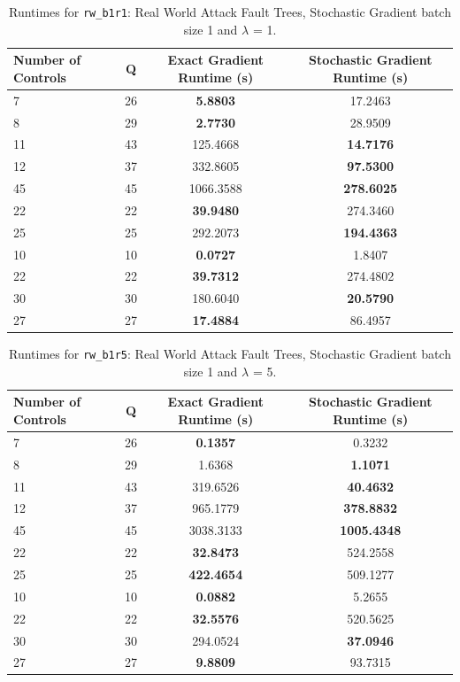 \documentclass{article}
\begin{document}
\begin{table}[h]
\centering
\begin{tabular}{lccc}
\toprule
Number of Controls & Q & Exact Gradient Runtime (s) & Stochastic Gradient Runtime (s) \\
\midrule
7 & 26 & \textbf{5.8803} & 17.2463 \\
8 & 29 & \textbf{2.7730} & 28.9509 \\
11 & 43 & 125.4668 & \textbf{14.7176} \\
12 & 37 & 332.8605 & \textbf{97.5300} \\
45 & 45 & 1066.3588 & \textbf{278.6025} \\
22 & 22 & \textbf{39.9480} & 274.3460 \\
25 & 25 & 292.2073 & \textbf{194.4363} \\
10 & 10 & \textbf{0.0727} & 1.8407 \\
22 & 22 & \textbf{39.7312} & 274.4802 \\
30 & 30 & 180.6040 & \textbf{20.5790} \\
27 & 27 & \textbf{17.4884} & 86.4957 \\
\bottomrule
\end{tabular}
\caption{Runtimes for \texttt{rw\_b1r1}: Real World Attack Fault Trees, Stochastic Gradient batch size 1 and $\lambda$ = 1.}
\end{table}

\begin{table}[h]
\centering
\begin{tabular}{lccc}
\toprule
Number of Controls & Q & Exact Gradient Runtime (s) & Stochastic Gradient Runtime (s) \\
\midrule
7 & 26 & \textbf{0.1357} & 0.3232 \\
8 & 29 & 1.6368 & \textbf{1.1071} \\
11 & 43 & 319.6526 & \textbf{40.4632} \\
12 & 37 & 965.1779 & \textbf{378.8832} \\
45 & 45 & 3038.3133 & \textbf{1005.4348} \\
22 & 22 & \textbf{32.8473} & 524.2558 \\
25 & 25 & \textbf{422.4654} & 509.1277 \\
10 & 10 & \textbf{0.0882} & 5.2655 \\
22 & 22 & \textbf{32.5576} & 520.5625 \\
30 & 30 & 294.0524 & \textbf{37.0946} \\
27 & 27 & \textbf{9.8809} & 93.7315 \\
\bottomrule
\end{tabular}
\caption{Runtimes for \texttt{rw\_b1r5}: Real World Attack Fault Trees, Stochastic Gradient batch size 1 and $\lambda$ = 5.}
\end{table}
\end{document}
